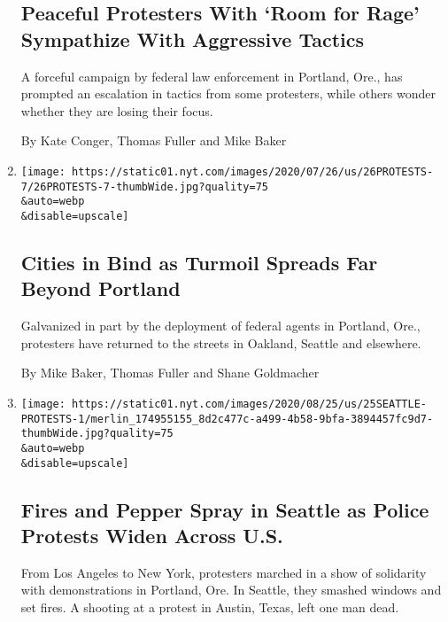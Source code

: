 \begin{enumerate}
  \hypertarget{peaceful-protesters-with-room-for-rage-sympathize-with-aggressive-tactics}{%
  \subsection{Peaceful Protesters With `Room for Rage' Sympathize With
  Aggressive
  Tactics}\label{peaceful-protesters-with-room-for-rage-sympathize-with-aggressive-tactics}}

  A forceful campaign by federal law enforcement in Portland, Ore., has
  prompted an escalation in tactics from some protesters, while others
  wonder whether they are losing their focus.

  By Kate Conger, Thomas Fuller and Mike Baker
\item
  \href{/2020/07/26/us/protests-portland-seattle-trump.html}{}

  \texttt{[image: https://static01.nyt.com/images/2020/07/26/us/26PROTESTS-7/26PROTESTS-7-thumbWide.jpg?quality=75\\\&auto=webp\\\&disable=upscale]}

  \hypertarget{cities-in-bind-as-turmoil-spreads-far-beyond-portland}{%
  \subsection{Cities in Bind as Turmoil Spreads Far Beyond
  Portland}\label{cities-in-bind-as-turmoil-spreads-far-beyond-portland}}

  Galvanized in part by the deployment of federal agents in Portland,
  Ore., protesters have returned to the streets in Oakland, Seattle and
  elsewhere.

  By Mike Baker, Thomas Fuller and Shane Goldmacher
\item
  \href{/2020/07/25/us/protests-seattle-portland.html}{}

  \texttt{[image: https://static01.nyt.com/images/2020/08/25/us/25SEATTLE-PROTESTS-1/merlin\_174955155\_8d2c477c-a499-4b58-9bfa-3894457fc9d7-thumbWide.jpg?quality=75\\\&auto=webp\\\&disable=upscale]}

  \hypertarget{fires-and-pepper-spray-in-seattle-as-police-protests-widen-across-us}{%
  \subsection{Fires and Pepper Spray in Seattle as Police Protests Widen
  Across
  U.S.}\label{fires-and-pepper-spray-in-seattle-as-police-protests-widen-across-us}}

  From Los Angeles to New York, protesters marched in a show of
  solidarity with demonstrations in Portland, Ore. In Seattle, they
  smashed windows and set fires. A shooting at a protest in Austin,
  Texas, left one man dead.


\end{enumerate}
